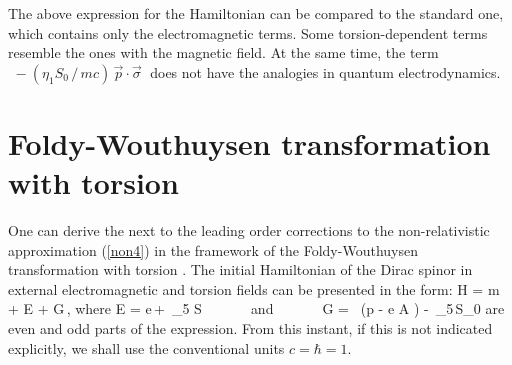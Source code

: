 The above expression for the Hamiltonian can be
compared to the standard one, which contains only  the 
electromagnetic terms. Some torsion-dependent terms resemble the 
ones with the magnetic field. At the same time, the term
$\,\,- (\eta_1 S_0\,/\,{mc})\,\vec{p}\cdot\vec{\sigma}\;$ does 
not have the analogies in quantum electrodynamics.

\section{Foldy-Wouthuysen transformation with torsion}

One can derive the next to the
leading order corrections to the non-relativistic approximation 
(\ref{non4}) in the framework of the Foldy-Wouthuysen 
transformation with torsion \cite{rysh}.
The initial Hamiltonian of the Dirac spinor in 
external electromagnetic
and torsion fields can be presented in the form:
\beq
H = \be m + {\cal E} + {\cal G}\,,
\label{inham}
\eeq
where
\beq
 {\cal E} = e\,\Phi + \eta\,\ga_5\,{\vec \al}\,{\vec S}
\,\,\,\,\,\,\,\,\,\,\,\,\,\,\,\,\, {\rm and}
\,\,\,\,\,\,\,\,\,\,\,\,\,\,\,\,\,
{\cal G} = {\vec \al}
\, \left({\vec p} - e {\vec A} \right) - \eta\,\ga_5\,S_0
\label{evenodd}
\eeq
are even and odd parts of the expression. From this instant,
if this is not indicated explicitly, we shall 
use the conventional units $c={\hbar} = 1$.

